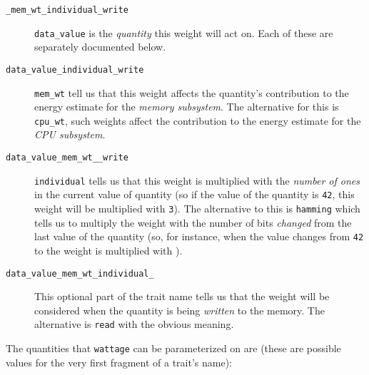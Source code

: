 \begin{description}
\item[\texttt{\_mem\_wt\_individual\_write}] \hfill

  \texttt{data\_value} is the \textit{quantity} this weight will act
  on.  Each of these are separately documented below.

\item[\texttt{data\_value\_individual\_write}] \hfill

  \texttt{mem\_wt} tell us that this weight affects the quantity's
  contribution to the energy estimate for the \textit{memory
    subsystem}.  The alternative for this is \texttt{cpu\_wt}, such
  weights affect the contribution to the energy estimate for the
  \textit{CPU subsystem}.

\item[\texttt{data\_value\_mem\_wt\_\_write}] \hfill

  \texttt{individual} tells us that this weight is multiplied with the
  \textit{number of ones} in the current value of quantity (so if the
  value of the quantity is \texttt{42}, this weight will be multiplied
  with \texttt{3}).  The alternative to this is \texttt{hamming} which
  tells us to multiply the weight with the number of bits
  \textit{changed} from the last value of the quantity (so, for
  instance, when the value changes from \texttt{42} to  the
  weight is multiplied with ).

\item[\texttt{data\_value\_mem\_wt\_individual\_}] \hfill

  This optional part of the trait name tells us that the weight will
  be considered when the quantity is being \textit{written} to the
  memory.  The alternative is \texttt{read} with the obvious meaning.
  
\end{description}

The quantities that \texttt{wattage} can be parameterized on are
(these are possible values for the very first fragment of a trait's
name):

